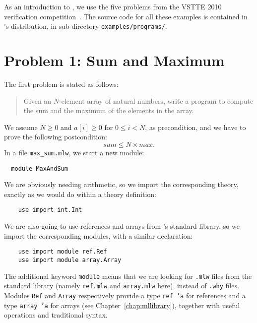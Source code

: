 \medskip
As an introduction to \whyml, we use the five problems from the VSTTE
2010 verification competition~\cite{vstte10comp}.
The source code for all these examples is contained in \why's
distribution, in sub-directory \texttt{examples/programs/}.

\section{Problem 1: Sum and Maximum}

The first problem is stated as follows:
\begin{quote}
  Given an $N$-element array of natural numbers,
  write a program to compute the sum and the maximum of the
  elements in the array.
\end{quote}
We  assume $N \ge 0$ and $a[i] \ge 0$ for $0 \le i < N$, as precondition,
and we have to prove the following postcondition:
\begin{displaymath}
  sum \le N \times max.
\end{displaymath}
In a file \verb|max_sum.mlw|, we start a new module:
\begin{verbatim}
  module MaxAndSum
\end{verbatim}
We are obviously needing arithmetic, so we import the corresponding
theory, exactly as we would do within a theory definition:
\begin{verbatim}
    use import int.Int
\end{verbatim}
We are also going to use references and arrays from \whyml's standard
library, so we import the corresponding modules, with a similar
declaration:
\begin{verbatim}
    use import module ref.Ref
    use import module array.Array
\end{verbatim}
The additional keyword \texttt{module} means that we are looking for
\texttt{.mlw} files from the standard library (namely \texttt{ref.mlw}
and \texttt{array.mlw} here), instead of \texttt{.why} files.
Modules \texttt{Ref} and \texttt{Array} respectively provide a type
\texttt{ref 'a} for references and a type \texttt{array 'a} for
arrays (see Chapter~\ref{chap:mllibrary}), together with useful
operations and traditional syntax.

